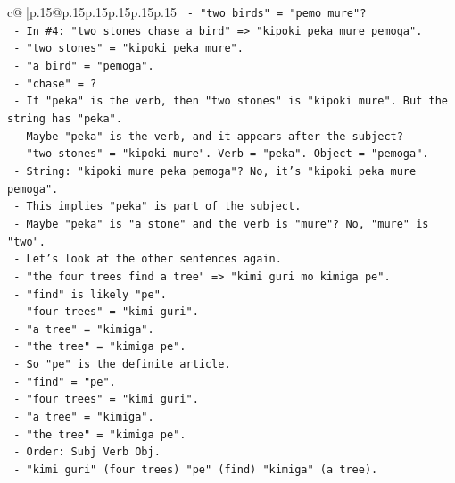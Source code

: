 \documentclass{article}
\begin{document}
{\begin{supertabular}{c@{$\;$}|p{.15\linewidth}@{}p{.15\linewidth}p{.15\linewidth}p{.15\linewidth}p{.15\linewidth}p{.15\linewidth}}
{{{\texttt{              {-} "two birds" = "pemo mure"?} \\
\texttt{              {-} In \#4: "two stones chase a bird" => "kipoki peka mure pemoga".} \\
\texttt{                {-} "two stones" = "kipoki peka mure".} \\
\texttt{                {-} "a bird" = "pemoga".} \\
\texttt{                {-} "chase" = ?} \\
\texttt{                {-} If "peka" is the verb, then "two stones" is "kipoki mure". But the string has "peka".} \\
\texttt{                {-} Maybe "peka" is the verb, and it appears after the subject?} \\
\texttt{                {-} "two stones" = "kipoki mure". Verb = "peka". Object = "pemoga".} \\
\texttt{                {-} String: "kipoki mure peka pemoga"? No, it's "kipoki peka mure pemoga".} \\
\texttt{                {-} This implies "peka" is part of the subject.} \\
\texttt{                {-} Maybe "peka" is "a stone" and the verb is "mure"? No, "mure" is "two".} \\
\texttt{                {-} Let's look at the other sentences again.} \\
\texttt{                {-} "the four trees find a tree" => "kimi guri mo kimiga pe".} \\
\texttt{                  {-} "find" is likely "pe".} \\
\texttt{                  {-} "four trees" = "kimi guri".} \\
\texttt{                  {-} "a tree" = "kimiga".} \\
\texttt{                  {-} "the tree" = "kimiga pe".} \\
\texttt{                  {-} So "pe" is the definite article.} \\
\texttt{                  {-} "find" = "pe".} \\
\texttt{                  {-} "four trees" = "kimi guri".} \\
\texttt{                  {-} "a tree" = "kimiga".} \\
\texttt{                  {-} "the tree" = "kimiga pe".} \\
\texttt{                  {-} Order: Subj Verb Obj.} \\
\texttt{                  {-} "kimi guri" (four trees) "pe" (find) "kimiga" (a tree).} \\
}}}
\end{supertabular}}
\end{document}
